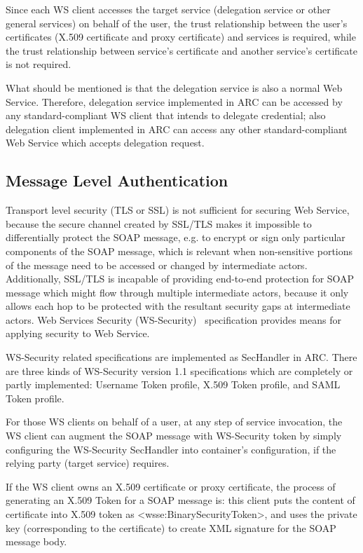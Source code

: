 \documentclass[twocolumn]{svjour3}         %
\begin{document}
Since each WS client accesses the target service (delegation service or other general services) on behalf of the user, the trust relationship between the user’s certificates (X.509 certificate and proxy certificate) and services is required, while the trust relationship between service’s certificate and another service’s certificate is not required.

What should be mentioned is that the delegation service is also a normal Web Service. Therefore, delegation service implemented in ARC can be accessed by any standard-compliant WS client that intends to delegate credential; also delegation client implemented in ARC can access any other standard-compliant Web Service which accepts delegation request.


\subsection{Message Level Authentication}
\label{sec:msgauthn}
Transport level security (TLS or SSL) is not sufficient for securing Web Service, because the secure channel created by SSL/TLS makes it impossible to differentially protect the SOAP message, e.g. to encrypt or sign only particular components of the SOAP message, which is relevant when non-sensitive portions of the message need to be accessed or changed by intermediate actors. Additionally, SSL/TLS is incapable of providing end-to-end protection for SOAP message which might flow through multiple intermediate actors, because it only allows each hop to be protected with the resultant security gaps at intermediate actors. Web Services Security (WS-Security)~\cite{WSSeclink} specification provides means for applying security to Web Service.

WS-Security related specifications are implemented as SecHandler in ARC. There are three kinds of WS-Security version 1.1 specifications which are completely or partly implemented: Username Token profile, X.509 Token profile, and SAML Token profile.

For those WS clients on behalf of a user, at any step of service invocation, the WS client can augment the SOAP message with WS-Security token by simply configuring the WS-Security SecHandler into container’s configuration, if the relying party (target service) requires.

If the WS client owns an X.509 certificate or proxy certificate, the process of generating an X.509 Token for a SOAP message is: this client puts the content of certificate into X.509 token as <wsse:BinarySecurityToken>, and uses the private key (corresponding to the certificate) to create XML signature for the SOAP message body.
\end{document}
